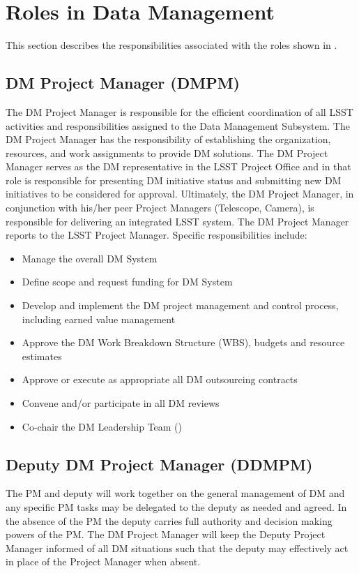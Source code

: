 \section{Roles in \gls{Data Management}}

This section describes the responsibilities associated with the roles shown in
.


\subsection{DM \gls{Project Manager} (\gls{DMPM})\label{role:dmpm}}

The \gls{DM} \gls{Project Manager} is responsible for the efficient coordination of all \gls{LSST} activities and responsibilities assigned to the \gls{Data Management} \gls{Subsystem}. The \gls{DM} \gls{Project Manager} has the responsibility of establishing the organization, resources, and work assignments to provide \gls{DM} solutions.  The \gls{DM} \gls{Project Manager} serves as the \gls{DM} representative in the \gls{LSST} Project Office and in that role is responsible for presenting \gls{DM} initiative status and submitting new \gls{DM} initiatives to be considered for approval. Ultimately, the \gls{DM} \gls{Project Manager}, in conjunction with his/her peer Project Managers (Telescope, \gls{Camera}), is responsible for delivering an integrated \gls{LSST} system. The \gls{DM} \gls{Project Manager} reports to the \gls{LSST} \gls{Project Manager}. Specific responsibilities include:

\begin{itemize}
\item Manage the overall \gls{DM} System
\item Define scope and request funding for \gls{DM} System
\item Develop and implement the \gls{DM} project management and control process, including earned value management
\item Approve the \gls{DM} \gls{Work Breakdown Structure} (\gls{WBS}), budgets and resource estimates
\item Approve or execute as appropriate all \gls{DM} outsourcing contracts
\item Convene and/or participate in all \gls{DM} reviews
\item Co-chair the \gls{DM} Leadership Team ()
\end{itemize}

\subsection{Deputy DM \gls{Project Manager} (\gls{DDMPM}) \label{role:ddmpm}}
The PM and deputy will work together on the general management of DM and any specific PM tasks may be delegated to the deputy as needed and agreed. In the absence of the PM the deputy carries full authority and decision making powers of the PM. The DM Project Manager will keep the Deputy Project Manager informed of all DM situations such that the deputy may effectively act in place of the Project Manager when absent.

